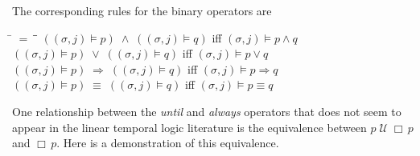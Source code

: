 \documentclass[fleqn, leqno]{article}
\newcommand{\mymathindent}{24pt}                    %
\newcommand{\impl}{\ensuremath{\Rightarrow}}        %
\newcommand{\Until}{\;\mathcal{U}\;}
\newcommand{\Always}{\Box\,}
\newcommand{\myqedtab}{\hspace{388.5pt}}              %
\begin{document}
The corresponding rules for the binary operators are

\begin{tabbing}
\hspace{\mymathindent} \= $= \;$ \= \myqedtab \= \kill
  \> $((\sigma, j) \models p) \;\land\; ((\sigma, j) \models q)$ \quad iff \quad $(\sigma, j) \models p\land q$\\
  \> $((\sigma, j) \models p) \;\lor\; ((\sigma, j) \models q)$ \quad iff \quad $(\sigma, j) \models p\lor q$\\
  \> $((\sigma, j) \models p) \;\impl\; ((\sigma, j) \models q)$ \quad iff \quad $(\sigma, j) \models p \impl q$\\
  \> $((\sigma, j) \models p) \;\equiv\; ((\sigma, j) \models q)$ \quad iff \quad $(\sigma, j) \models p \equiv q$
\end{tabbing}

One relationship between the \textit{until} and \textit{always} operators that does not seem to appear in the linear temporal
logic literature is the equivalence between $p\Until \Always p$ and $\Always p$.
Here is a demonstration of this equivalence.
\end{document}
